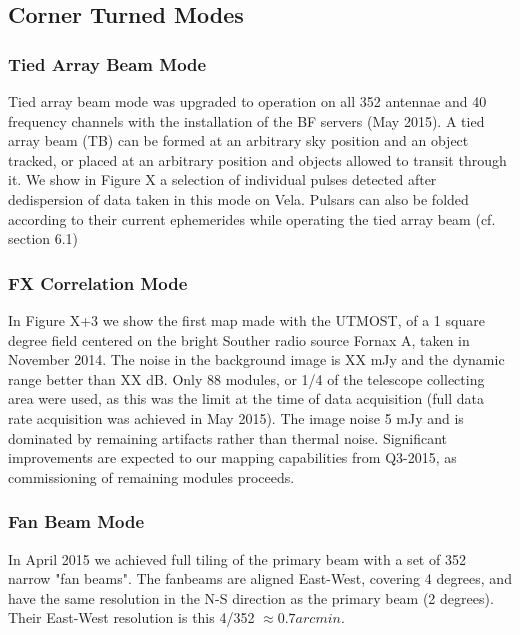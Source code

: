 \subsection{Corner Turned Modes}
\subsubsection{Tied Array Beam Mode}

Tied array beam mode was upgraded to operation on all 352 antennae and 40 frequency channels with the installation of the BF servers (May 2015). A tied array beam (TB) can be formed at an arbitrary sky position and an object tracked, or placed at an arbitrary position and objects allowed to transit through it. We show in Figure X a selection of individual pulses detected after dedispersion of data taken in this mode on Vela. Pulsars can also be folded according to their current ephemerides while operating the tied array beam (cf. section 6.1) 

\subsubsection{FX Correlation Mode}

In Figure X+3 we show the first map made with the UTMOST, of a 1 square degree field centered on the bright Souther radio source Fornax A, taken in November 2014. The noise in the background image is XX mJy and the dynamic range better than XX dB. Only 88 modules, or 1/4 of the telescope collecting area were used, as this was the limit at the time of data acquisition (full data rate acquisition was achieved in May 2015). The image noise 5 mJy and is dominated by remaining artifacts rather than thermal noise. Significant improvements are expected to our mapping capabilities from Q3-2015, as commissioning of remaining modules proceeds. 

\subsubsection{Fan Beam Mode}

In April 2015 we achieved full tiling of the primary beam with a set of 352 narrow "fan beams". The fanbeams are aligned East-West, covering 4 degrees, and have the same resolution in the N-S direction as the primary beam (2 degrees). Their East-West resolution is this 4/352 $\approx 0.7 arcmin$. 

